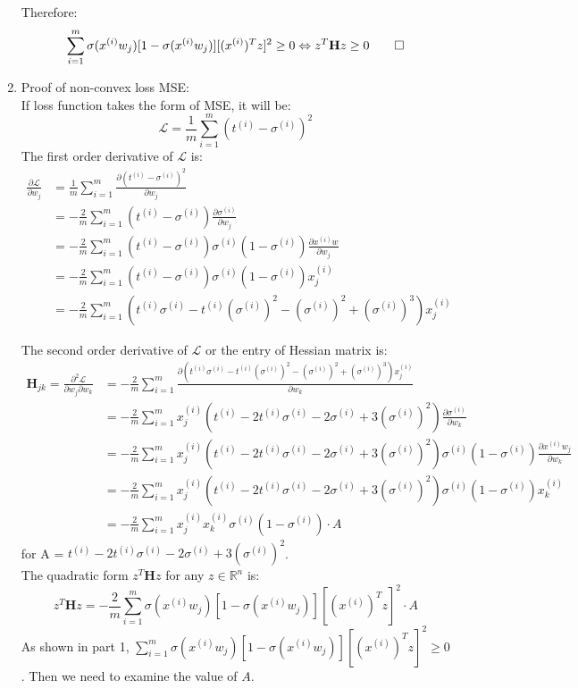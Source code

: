 \documentclass[a4paper, 12pt]{article}  %
\begin{document}
\begin{enumerate}
    Therefore:
    \[\sum_{i=1}^m \sigma(x^{(i)} w_j)[1 - \sigma(x^{(i)} w_j)][(x^{(i)})^T z]^2 \geq 0 \Leftrightarrow z^T \mathbf{H} z \geq 0 \qed\] 
    
    \item Proof of non-convex loss MSE:\\
    If loss function takes the form of MSE, it will be:
    \[\mathcal{L} = \frac{1}{m} \sum_{i=1}^m (t^{(i)} - \sigma^{(i)})^2 \]
    The first order derivative of $\mathcal{L}$ is:
    \begin{align*}
        \frac{\partial \mathcal{L}}{\partial w_j} &= \frac{1}{m} \sum_{i=1}^m \frac{\partial (t^{(i)} - \sigma^{(i)})^2}{\partial w_j} \\
        &= -\frac{2}{m} \sum_{i=1}^m (t^{(i)} - \sigma^{(i)}) \frac{\partial \sigma^{(i)}}{\partial w_j}\\
        &= -\frac{2}{m} \sum_{i=1}^m (t^{(i)} - \sigma^{(i)}) \sigma^{(i)} (1 - \sigma^{(i)}) \frac{\partial x^{(i)} w}{\partial w_j}\\
        &= -\frac{2}{m} \sum_{i=1}^m (t^{(i)} - \sigma^{(i)}) \sigma^{(i)} (1 - \sigma^{(i)}) x^{(i)}_j\\
        &= -\frac{2}{m} \sum_{i=1}^m (t^{(i)} \sigma^{(i)} - t^{(i)} (\sigma^{(i)})^2 - (\sigma^{(i)})^2 + (\sigma^{(i)})^3)x^{(i)}_j
    \end{align*}
    
    The second order derivative of $\mathcal{L}$ or the entry of Hessian matrix is:
    \begin{align*}
        \mathbf{H}_{jk} = \frac{\partial^2 \mathcal{L}}{\partial w_j \partial w_k} &= -\frac{2}{m} \sum^m_{i=1} \frac{\partial (t^{(i)} \sigma^{(i)} - t^{(i)} (\sigma^{(i)})^2 - (\sigma^{(i)})^2 + (\sigma^{(i)})^3) x^{(i)}_j}{\partial w_k}\\
        &= -\frac{2}{m} \sum^m_{i=1} x^{(i)}_j (t^{(i)} - 2 t^{(i)} \sigma^{(i)} -2 \sigma^{(i)} + 3(\sigma^{(i)})^2) \frac{\partial \sigma^{(i)}}{\partial w_k} \\
        &= -\frac{2}{m} \sum^m_{i=1} x^{(i)}_j (t^{(i)} - 2 t^{(i)} \sigma^{(i)} -2 \sigma^{(i)} + 3(\sigma^{(i)})^2) \sigma^{(i)} (1 - \sigma^{(i)})  \frac{\partial x^{(i)} w_j}{\partial w_k}\\
        &= -\frac{2}{m} \sum^m_{i=1} x^{(i)}_j (t^{(i)} - 2 t^{(i)} \sigma^{(i)} -2 \sigma^{(i)} + 3(\sigma^{(i)})^2) \sigma^{(i)} (1 - \sigma^{(i)}) x^{(i)}_k \\
        &= -\frac{2}{m} \sum^m_{i=1} x^{(i)}_j x^{(i)}_k \sigma^{(i)} (1 - \sigma^{(i)}) \cdot A
    \end{align*}
    for A = \(t^{(i)} - 2 t^{(i)} \sigma^{(i)} -2 \sigma^{(i)} + 3(\sigma^{(i)})^2\).\\
    The quadratic form $z^T\mathbf{H}z$ for any $z \in \mathbb{R}^n$ is:
    \[z^T\mathbf{H}z = -\frac{2}{m} \sum_{i=1}^m \sigma(x^{(i)} w_j)[1 - \sigma(x^{(i)} w_j)][(x^{(i)})^T z]^2 \cdot A\]
    As shown in part 1, \(\sum_{i=1}^m \sigma(x^{(i)} w_j)[1 - \sigma(x^{(i)} w_j)][(x^{(i)})^T z]^2 \geq 0\). Then we need to examine the value of $A$.
    

\end{enumerate}
\end{document}
